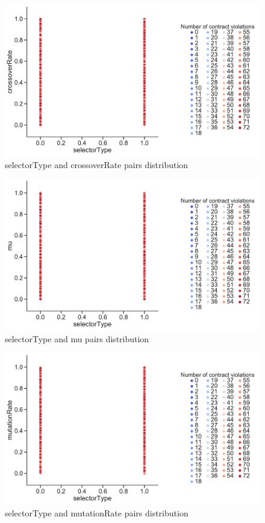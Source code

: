 \begin{figure}
	\centering
	\includegraphics[width=\textwidth]{images/PairsDistr/selectorType_crossoverRate.pdf}
	\caption[selectorType and crossoverRate pairs distribution]{selectorType and crossoverRate pairs distribution}  
	\label{fig:selectorType_crossoverRate_pair}
\end{figure}
\begin{figure}
	\centering
	\includegraphics[width=\textwidth]{images/PairsDistr/selectorType_mu.pdf}
	\caption[selectorType and mu pairs distribution]{selectorType and mu pairs distribution}
	\label{fig:selectorType_mu_pair}
\end{figure}
\begin{figure}
	\centering
	\includegraphics[width=\textwidth]{images/PairsDistr/selectorType_mutationRate.pdf}
	\caption[selectorType and mutationRate pairs distribution]{selectorType and mutationRate pairs distribution}
	\label{fig:selectorType_mutationRate_pair}
\end{figure}
